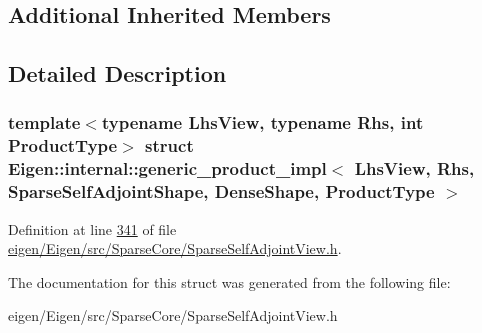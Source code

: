 \subsection*{Additional Inherited Members}


\subsection{Detailed Description}
\subsubsection*{template$<$typename Lhs\+View, typename Rhs, int Product\+Type$>$\newline
struct Eigen\+::internal\+::generic\+\_\+product\+\_\+impl$<$ Lhs\+View, Rhs, Sparse\+Self\+Adjoint\+Shape, Dense\+Shape, Product\+Type $>$}



Definition at line \hyperlink{eigen_2_eigen_2src_2_sparse_core_2_sparse_self_adjoint_view_8h_source_l00341}{341} of file \hyperlink{eigen_2_eigen_2src_2_sparse_core_2_sparse_self_adjoint_view_8h_source}{eigen/\+Eigen/src/\+Sparse\+Core/\+Sparse\+Self\+Adjoint\+View.\+h}.



The documentation for this struct was generated from the following file\+:\begin{DoxyCompactItemize}
\item 
eigen/\+Eigen/src/\+Sparse\+Core/\+Sparse\+Self\+Adjoint\+View.\+h\end{DoxyCompactItemize}
